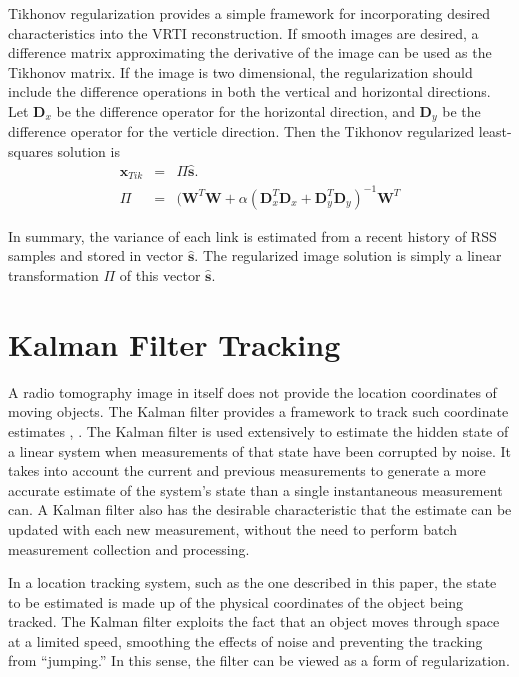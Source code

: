 \documentclass[journal]{IEEEtran}
\begin{document}
Tikhonov regularization provides a simple framework for incorporating desired characteristics into the VRTI reconstruction. If smooth images are desired, a difference matrix approximating the derivative of the image can be used as the Tikhonov matrix. If the image is two dimensional, the regularization should include the difference operations in both the vertical and horizontal directions.  Let $\textbf{D}_x$ be the difference operator for the horizontal direction, and $\textbf{D}_y$ be the difference operator for the verticle direction. Then the Tikhonov regularized least-squares solution is
\begin{eqnarray}
\textbf{x}_{Tik} &=& \Pi \hat{\textbf{s}}. \\
\Pi &=& (\textbf{W}^T \textbf{W} + \alpha ( \textbf{D}_x^T \textbf{D}_x + \textbf{D}_y^T \textbf{D}_y)^{-1} \textbf{W}^T \nonumber
\end{eqnarray}

In summary, the variance of each link is estimated from a recent history of RSS samples and stored in vector $\hat{\textbf{s}}$. The regularized image solution is simply a linear transformation $\Pi$ of this vector $\hat{\textbf{s}}$.

\section{Kalman Filter Tracking}\label{section.kalman}
A radio tomography image in itself does not provide the location coordinates of moving objects. The Kalman filter provides a framework to track such coordinate estimates \cite{Maybeck79}, \cite{Welch95}. The Kalman filter is used extensively to estimate the hidden state of a linear system when measurements of that state have been corrupted by noise. It takes into account the current and previous measurements to generate a more accurate estimate of the system's state than a single instantaneous measurement can. A Kalman filter also has the desirable characteristic that the estimate can be updated with each new measurement, without the need to perform batch measurement collection and processing.

In a location tracking system, such as the one described in this paper, the state to be estimated is made up of the physical coordinates of the object being tracked. The Kalman filter exploits the fact that an object moves through space at a limited speed, smoothing the effects of noise and preventing the tracking from ``jumping.'' In this sense, the filter can be viewed as a form of regularization.
\end{document}
